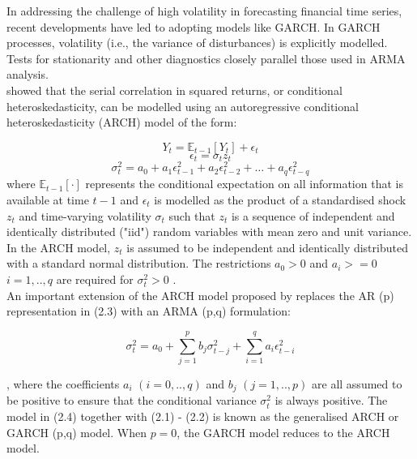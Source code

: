\documentclass[oneside,12pt]{CUEDthesisPSnPDF}
\newcommand{\E}{\mathbb{E}}
\newcommand{\textcite}{\citet}
\begin{document}
In addressing the challenge of high volatility in forecasting financial time series, recent developments have led to adopting models like GARCH. In GARCH processes, volatility (i.e., the variance of disturbances) is explicitly modelled. Tests for stationarity and other diagnostics closely parallel those used in ARMA analysis. \\

\textcite{engle1982autoregressive} showed that the serial correlation in squared returns, or conditional heteroskedasticity, can be modelled using an autoregressive conditional heteroskedasticity (ARCH) model of the form:

\begin{equation}
Y_t = \E_{t-1}[Y_t] + \epsilon_t
\end{equation}
\vspace{8pt}
\begin{equation}
\epsilon_t = \sigma_t z_t
\end{equation}
\vspace{8pt}
\begin{equation}
\sigma_t^2 = a_0 + a_1 \epsilon_{t-1}^2 + a_2 \epsilon_{t-2}^2 + \dots + a_q \epsilon_{t-q}^2    
\end{equation}
where \(\E_{t-1}[\cdot]\) represents the conditional expectation on all information that is available at time \(t-1\) and \(\epsilon_t\) is modelled as the product of a standardised shock \(z_t\) and time-varying volatility \(\sigma_t\) such that \(z_t\) is a sequence of independent and identically distributed ("iid") random variables with mean zero and unit variance. In the ARCH model, \(z_t\) is assumed to be independent and identically distributed with a standard normal distribution. The restrictions \(a_0 > 0\)  and \(a_i >= 0\) \(i = 1,..,q\) are required for \(\sigma_t^2 > 0\) .\\

An important extension of the ARCH model proposed by \textcite{bollerslev1986generalised} replaces the AR (p) representation in (2.3) with an ARMA (p,q) formulation:

\begin{equation}
\sigma_t^2 = a_0 + \sum_{j=1}^p b_j \sigma_{t-j}^2 + \sum_{i=1}^q a_i \epsilon_{t-i}^2  
\end{equation}

, where the coefficients \(a_i\) \((i=0,..,q)\) and \(b_j\) \((j=1,..,p)\) are all assumed to be positive to ensure that the conditional variance \(\sigma_t^2\) is always positive. The model in (2.4) together with (2.1) - (2.2) is known as the generalised ARCH or GARCH (p,q) model. When \(p=0\), the GARCH model reduces to the ARCH model.\\
\end{document}
